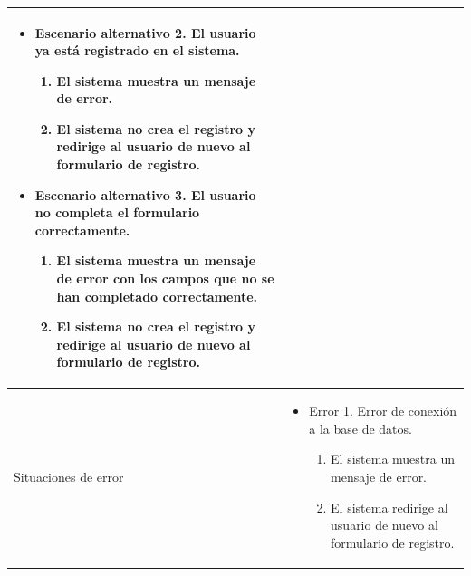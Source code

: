 \begin{longtable}{
>{\columncolor{lightgreen!20}}p{4cm}
p{12cm}
}
\begin{itemize}[nosep,leftmargin=*]
  \item Escenario alternativo 2. El usuario ya está registrado en el sistema.
  \begin{enumerate}[nosep,leftmargin=*]
      \item El sistema muestra un mensaje de error.
      \item El sistema no crea el registro y redirige al usuario de nuevo al formulario de registro.
  \end{enumerate}
  \item Escenario alternativo 3. El usuario no completa el formulario correctamente.
  \begin{enumerate}[nosep,leftmargin=*]
      \item El sistema muestra un mensaje de error con los campos que no se han completado correctamente.
      \item El sistema no crea el registro y redirige al usuario de nuevo al formulario de registro.
  \end{enumerate}
\end{itemize} \\
\midrule
Situaciones de error & \begin{itemize}[nosep,leftmargin=*]
  \item Error 1. Error de conexión a la base de datos.
  \begin{enumerate}[nosep,leftmargin=*]
      \item El sistema muestra un mensaje de error.
      \item El sistema redirige al usuario de nuevo al formulario de registro.
  \end{enumerate}
\end{itemize} \\
\end{longtable}